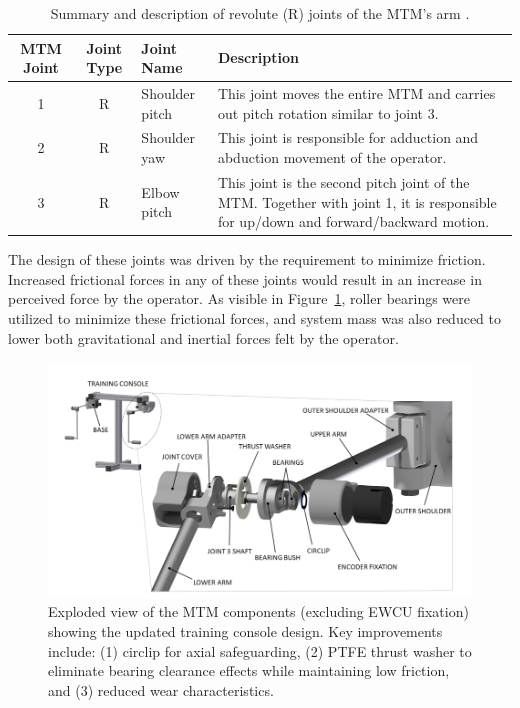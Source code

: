 \begin{table}[h]
\centering
\caption{Summary and description of revolute (R) joints of the MTM's arm \cite{ref19,ref20}.}
\label{tab:mtm_joints}
\begin{tabular}{|c|c|l|p{8cm}|}
\hline
\textbf{MTM Joint} & \textbf{Joint Type} & \textbf{Joint Name} & \textbf{Description} \\
\hline
1 & R & Shoulder pitch & This joint moves the entire MTM and carries out pitch rotation similar to joint 3. \\
\hline
2 & R & Shoulder yaw & This joint is responsible for adduction and abduction movement of the operator. \\
\hline
3 & R & Elbow pitch & This joint is the second pitch joint of the MTM. Together with joint 1, it is responsible for up/down and forward/backward motion. \\
\hline
\end{tabular}
\end{table}

The design of these joints was driven by the requirement to minimize friction. Increased frictional forces in any of these joints would result in an increase in perceived force by the operator. As visible in Figure~\ref{fig:mtm_detailed}, roller bearings were utilized to minimize these frictional forces, and system mass was also reduced to lower both gravitational and inertial forces felt by the operator.

\begin{figure}[h]
    \centering
    \includegraphics[width=0.75\linewidth]{mtm_detailed.png}
    \caption{Exploded view of the MTM components (excluding EWCU fixation) showing the updated training console design. Key improvements include: (1) circlip for axial safeguarding, (2) PTFE thrust washer to eliminate bearing clearance effects while maintaining low friction, and (3) reduced wear characteristics.}
    \label{fig:mtm_detailed}
\end{figure}


